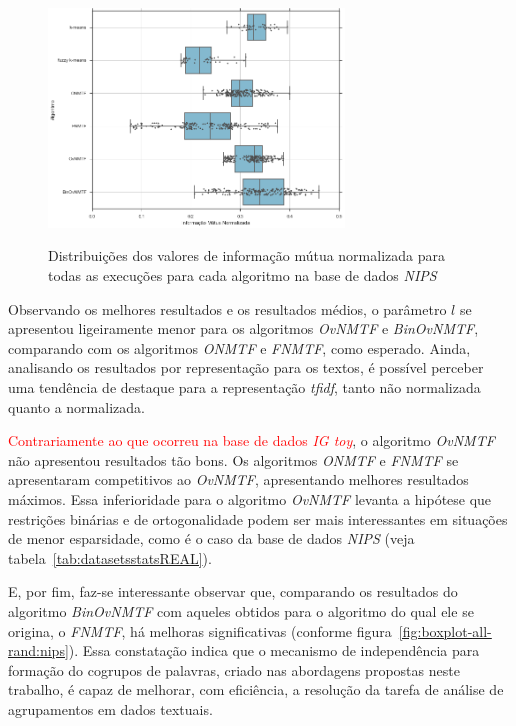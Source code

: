 \documentclass[
    12pt,                %
    oneside,            %
    a4paper,            %
    english,            %
    brazil                %
    ]{abntex2ppgsi}
\begin{document}
\begin{figure}[H]
    \centering
    \caption{Distribuições dos valores de informação mútua normalizada para todas as execuções para cada algoritmo na base de dados \textit{NIPS}}
    \includegraphics[width=0.7\textwidth]{img/boxplot-all-nmi-nips.png}
    \label{fig:boxplot-all-nmi:nips}
\end{figure}

Observando os melhores resultados e os resultados médios, o parâmetro $l$ se apresentou ligeiramente menor para os algoritmos \textit{OvNMTF} e \textit{BinOvNMTF}, comparando com os algoritmos \textit{ONMTF} e \textit{FNMTF}, como esperado. Ainda, analisando os resultados por representação para os textos, é possível perceber uma tendência de destaque para a representação \textit{tfidf}, tanto não normalizada quanto a normalizada.


\textcolor{red}{Contrariamente ao que ocorreu na base de dados \textit{IG toy}}, o algoritmo \textit{OvNMTF} não apresentou resultados tão bons. Os algoritmos \textit{ONMTF} e \textit{FNMTF} se apresentaram competitivos ao \textit{OvNMTF}, apresentando melhores resultados máximos. Essa inferioridade para o algoritmo \textit{OvNMTF} levanta a hipótese que restrições binárias e de ortogonalidade podem ser mais interessantes em situações de menor esparsidade, como é o caso da base de dados \textit{NIPS} (veja tabela~\ref{tab:datasetsstatsREAL}).

E, por fim, faz-se interessante observar que, comparando os resultados do algoritmo \textit{BinOvNMTF} com aqueles obtidos para o algoritmo do qual ele se origina, o \textit{FNMTF}, há melhoras significativas (conforme figura~\ref{fig:boxplot-all-rand:nips}). Essa constatação indica que o mecanismo de independência para formação do cogrupos de palavras, criado nas abordagens propostas neste trabalho, é capaz de melhorar, com eficiência, a resolução da tarefa de análise de agrupamentos em dados textuais.
\end{document}
